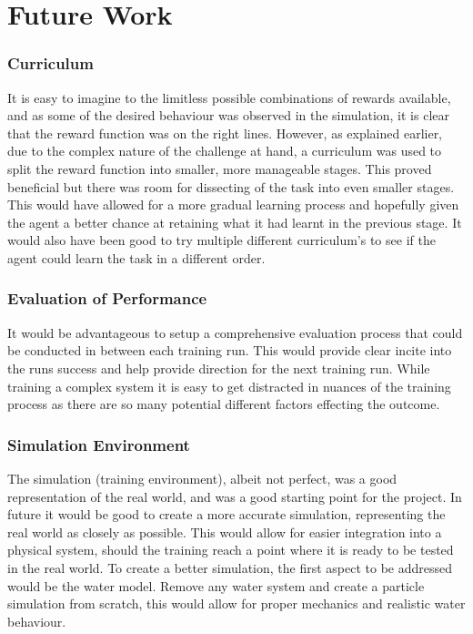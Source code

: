 

\let\textcircled=\pgftextcircled\chapter{Future Work}\label{chap:future_work}

\subsection*{Curriculum}

It is easy to imagine to the limitless possible combinations of rewards available, and as some of the desired behaviour was observed in the simulation, it is clear that the reward function was on the right lines. However, as explained earlier, due to the complex nature of the challenge at hand, a curriculum was used to split the reward function into smaller, more manageable stages. This proved beneficial but there was room for dissecting of the task into even smaller stages. This would have allowed for a more gradual learning process and hopefully given the agent a better chance at retaining what it had learnt in the previous stage. It would also have been good to try multiple different curriculum's to see if the agent could learn the task in a different order.


\subsection*{Evaluation of Performance}
It would be advantageous to setup a comprehensive evaluation process that could be conducted in between each training run. This would provide clear incite into the runs success and help provide direction for the next training run. While training a complex system it is easy to get distracted in nuances of the training process as there are so many potential different factors effecting the outcome. 

\subsection*{Simulation Environment}

The simulation (training environment), albeit not perfect, was a good representation of the real world, and was a good starting point for the project. In future it would be good to create a more accurate simulation, representing the real world as closely as possible. This would allow for easier integration into a physical system, should the training reach a point where it is ready to be tested in the real world. To create a better simulation, the first aspect to be addressed would be the water model. Remove any water system and create a particle simulation from scratch, this would allow for proper mechanics and realistic water behaviour.

